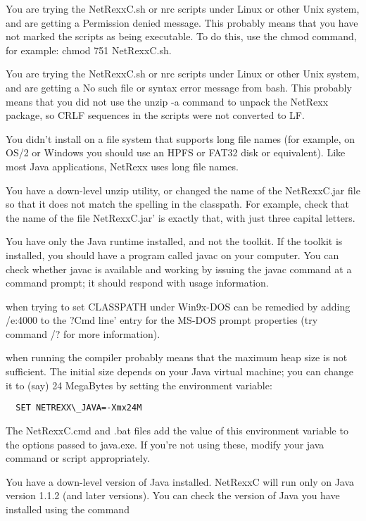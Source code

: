 \begin{description}
\item[Permission Denied] You are trying the NetRexxC.sh or nrc scripts under Linux or other Unix system, and are getting a Permission denied message. This probably means that you have not marked the scripts as being executable. To do this, use the chmod command, for example: chmod 751 NetRexxC.sh.
\item[No such file]  You are trying the NetRexxC.sh or nrc scripts under Linux or other Unix system, and are getting a No such file or syntax error message from bash. This probably means that you did not use the unzip -a command to unpack the NetRexx package, so CRLF sequences in the scripts were not converted to LF.
\item You didn't install on a file system that supports long file names (for example, on OS/2 or Windows you should use an HPFS or FAT32 disk or equivalent). Like most Java applications, NetRexx uses long file names.
\item[Downlevel zip] You have a down-level unzip utility, or changed the name of the NetRexxC.jar file so that it does not match the spelling in the classpath. For example, check that the name of the file NetRexxC.jar’ is exactly that, with just three capital letters.
\item You have only the Java runtime installed, and not the toolkit. If the toolkit is installed, you should have a program called javac on your computer. You can check whether javac is available and working by issuing the javac command at a command prompt; it should respond with usage information.
\item[out of environment space] when trying to set CLASSPATH under Win9x-DOS can be remedied by adding /e:4000 to the ?Cmd line’ entry for the MS-DOS prompt properties (try command /? for more information).
\item[java.lang.OutOfMemoryError] when running the compiler probably means that the maximum heap size is not sufficient. The initial size depends on your Java virtual machine; you can change it to (say) 24 MegaBytes by setting the environment variable:
\begin{verbatim}
  SET NETREXX\_JAVA=-Xmx24M
\end{verbatim}
The NetRexxC.cmd and .bat files add the value of this environment variable to the options passed to java.exe. If you're not using these, modify your java command or script appropriately.
\item[Down-level Java]  You have a down-level version of Java installed. NetRexxC will run only on Java version 1.1.2 (and later versions). You can check the version of Java you have installed using the command 

\end{description}
